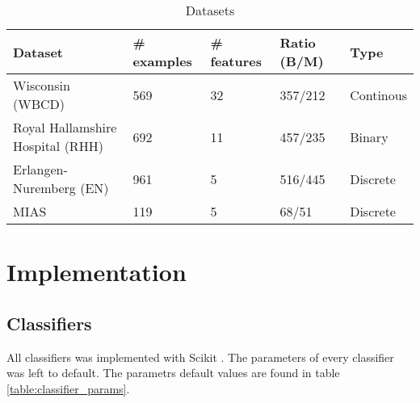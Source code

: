 \medskip
\begin{table}[ht!]
\begin{adjustwidth}{-5.in}{-5.in}
\begin{center}
   \begin{tabular}{l*{4}{l}}
   \hline
   Dataset         &
   \# examples  &
   \# features  &
   Ratio (B/M)     &
   Type            \\
   \hline
   Wisconsin (WBCD)						 &
   569                         &
   32                          &
   357/212                     &
   Continous                   \\
   Royal Hallamshire Hospital (RHH)  &
   692                         &
   11                          &
   457/235                     &
   Binary                      \\
   Erlangen-Nuremberg (EN)     &
   961                         &
   5                           &
   516/445                     &
   Discrete                    \\
   MIAS         							 &
   119                         &
   5                           &
   68/51                     	 &
   Discrete                    \\
  \hline
  \end{tabular}
  \caption{Datasets}
  \label{table:datasets_info}
\end{center}
\end{adjustwidth}
\end{table}


\section{Implementation}

\subsection{Classifiers}
All classifiers was implemented with Scikit \parencite{scikit-learn}. The parameters of every classifier was left to default. The parametrs default values are found in table \ref{table:classifier_params}.


